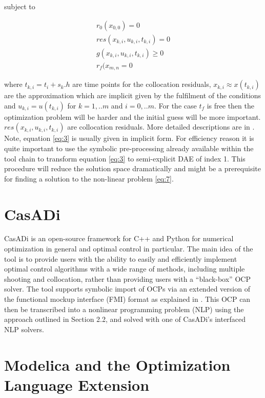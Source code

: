 subject to

\begin{equation}\label{eq:7}
	\begin{aligned}
		r_0(x_{0,0}) = 0 \\
		res(x_{k,i}, u_{k,i}, t_{k,i} ) = 0 \\
		g(x_{k,i}, u_{k,i}, t_{k,i} ) \geq 0 \\
		r_f(x_{m,n} = 0
	\end{aligned}
\end{equation}

where $ t_{k,i} = t_i+s_k.h $ are time points for the collocation residuals, $ x_{k,i} \approx x(t_{k,i}) $ are the approximation which are implicit given by the fulfilment of the conditions and $ u_{k,i}= u(t_{k,i}) $  for $ k=1,..m $ and $ i=0,..m.$ For the case $t_f$ is free then the optimization problem will be harder and the initial guess will be more important. $ res(x_{k,i},u_{k,i},t_{k,i} )$ are collocation residuals. More detailed descriptions are in \cite{bernhard}. Note, equation \ref{eq:3} is usually given in implicit form. For efficiency reason it is quite important to use the symbolic pre-processing already available within the tool chain to transform equation \ref{eq:3} to semi-explicit DAE of index 1. This procedure will reduce the solution space dramatically and might be a prerequisite for finding a solution to the non-linear problem \ref{eq:7}.

\section{CasADi}
\label{sec:optcasadi}

CasADi \cite{casadi} is an open-source framework for C++ and Python for numerical optimization in general and optimal control in particular. The main idea of the tool is to provide users with the ability to easily and efficiently implement optimal control algorithms with a wide range of methods, including multiple shooting and collocation, rather than providing users with a “black-box” OCP solver.
The tool supports symbolic import of OCPs via an extended version of the functional mockup interface (FMI) format as explained in \cite{optandersson}. This OCP can then be transcribed into a nonlinear programming problem (NLP) using the approach outlined in Section 2.2, and solved with one of CasADi’s interfaced NLP solvers.

\section{Modelica and the Optimization Language Extension}
\label{sec:optimizationoptimica}


